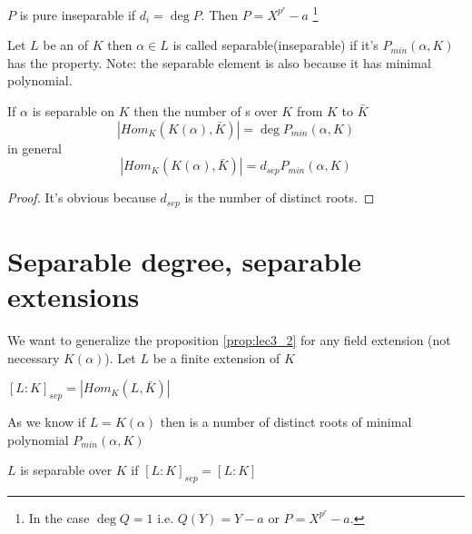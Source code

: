 \begin{definition}
  $P$ is pure inseparable if $d_i = \deg P$.
  Then $P = X^{p^r} - a$
  \footnote{
    In the case $\deg Q = 1$ i.e. $Q\left(Y\right) = Y- a$ or
    $P = X^{p^r} - a$.
  }
  \label{def:deginseppol}
\end{definition}

\begin{definition}
  Let $L$ be an  of $K$ then $\alpha \in L$ is
  called separable(inseparable) if it's
   $P_{min}\left(\alpha, K\right)$ has
  the property.
  Note: the separable element is also 
  because it has minimal polynomial.
  \label{def:degsepelem}
\end{definition}

\begin{proposition}
  If $\alpha$ is separable on $K$ then the number of
  s over $K$ from $K$ to $\bar{K}$
  \[
  \left|Hom_K\left(K\left(\alpha\right), \bar{K}\right)\right| =
  \deg P_{min}\left(\alpha, K\right)
  \]
  in general
  \[
  \left|Hom_K\left(K\left(\alpha\right), \bar{K}\right)\right| =
  d_{sep} P_{min}\left(\alpha, K\right)
  \]  
  \begin{proof}
    It's obvious because $d_{sep}$ is the number of distinct roots.
  \end{proof}
  \label{prop:lec3_2}
\end{proposition}

\section{Separable degree, separable extensions}

We want to generalize the proposition \ref{prop:lec3_2} for any field
extension (not necessary $K\left(\alpha\right)$).
Let $L$ be a finite extension of $K$

\begin{definition}
  $\left[L:K\right]_{sep} = \left|Hom_K\left(L, \bar{K}\right)\right|$  
  \label{def:separabledegree}
\end{definition}

As we know if $L = K\left(\alpha\right)$ then
 is a number of distinct roots of
minimal polynomial $P_{min}\left(\alpha, K\right)$

\begin{definition}
  $L$ is separable over $K$ if
  $\left[L:K\right]_{sep} = \left[L:K\right]$
  \label{def:separableextension}
\end{definition}

